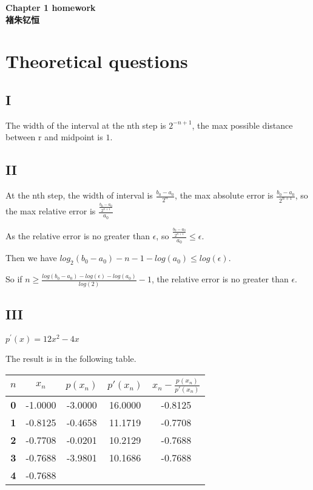 \documentclass[12]{article}%
\begin{document}
\begin{center}
    \LARGE\songti\textbf{Chapter 1 homework} \\%
    \large\kaishu\textbf{褚朱钇恒}%
\end{center}
    \section{Theoretical questions}
        \subsection{I}
            The width of the interval at the nth step is $2^{-n+1}$, the max possible distance between r and midpoint is $1$.
        \subsection{II}
            At the nth step, the width of interval is $\frac{b_0-a_0}{2^n}$, the max absolute error is $\frac{b_0-a_0}{2^{n+1}}$, so the max relative error is $\frac{\frac{b_0-a_0}{2^{n+1}}}{a_0}$

            As the relative error is no greater than $\epsilon$, so $\frac{\frac{b_0-a_0}{2^{n+1}}}{a_0} \le \epsilon$.

            Then we have $log_2(b_0-a_0)-n-1-log(a_0)\le log(\epsilon)$.

            So if $n \ge \frac{log(b_0-a_0)-log(\epsilon)-log(a_0)}{log(2)}-1$, the relative error is no greater than $\epsilon$.

        \subsection{III}
            $p^{'}(x)=12x^2-4x$
            
            The result is in the following table.
            \begin{table}[htbp]
                \centering
                \small
                \begin{tabular}{|c|c|c|c|c|}
                \hline
                \textbf{$n$} & \textbf{$x_n$} & \textbf{$p(x_n)$} & \textbf{$p'(x_n)$} & \textbf{$x_n-\frac{p(x_n)}{p'(x_n)}$} \\ \hline
                \textbf{0}   & -1.0000      & -3.0000           & 16.0000            & -0.8125                               \\ \hline
                \textbf{1}   & -0.8125      & -0.4658           & 11.1719            & -0.7708                               \\ \hline
                \textbf{2}   & -0.7708      & -0.0201           & 10.2129            & -0.7688                               \\ \hline
                \textbf{3}   & -0.7688      & -3.9801           & 10.1686            & -0.7688                               \\ \hline
                \textbf{4}   & -0.7688      &                   &                    &                                       \\ \hline
                \end{tabular}
            \end{table}
\end{document}
